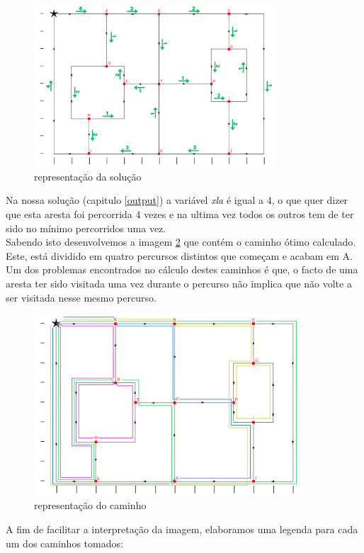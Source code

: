 \documentclass[a4paper]{report}
\begin{document}
\begin{figure}[H]
    \begin{center}
        \includegraphics[width=0.8\textwidth]{images/desafioVisited.png}\par
        \caption{representação da solução}
        \label{fig:visited}
    \end{center}
\end{figure}
Na nossa solução (capitulo \ref{output}) a variável \textit{xla} é igual a 4, o
que quer dizer que esta aresta foi percorrida 4 vezes e na ultima vez todos os
outros tem de ter sido no mínimo percorridos uma vez.\\
Sabendo isto desenvolvemos a imagem \ref{fig:path} que contém o caminho ótimo
calculado. Este, está dividido em quatro percursos distintos que começam e
acabam em A.
Um dos problemas encontrados no cálculo destes caminhos é que, o facto de uma
aresta ter sido visitada uma vez durante o percurso não implica que não volte a
ser visitada nesse mesmo percurso.

\begin{figure}[H]
    \begin{center}
        \includegraphics[width=0.9\textwidth]{images/desafioSolucao.png}\par
        \caption{representação do caminho}
        \label{fig:path}
    \end{center}
\end{figure}
A fim de facilitar a interpretação da imagem, elaboramos uma legenda para cada
um dos caminhos tomados:
\end{document}
